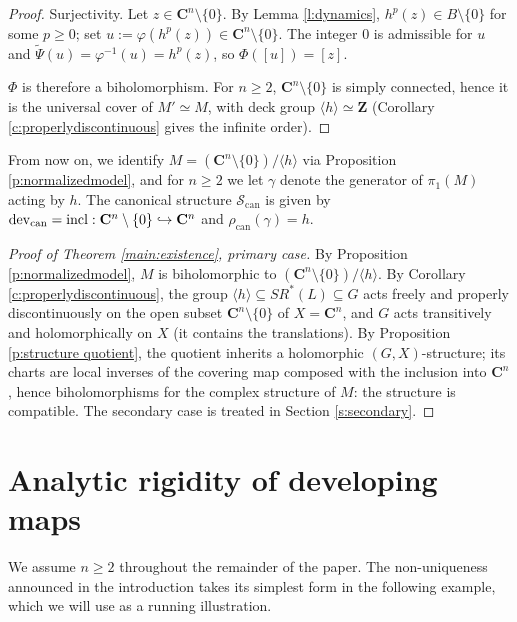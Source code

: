 \documentclass[english,11pt]{amsart}
\theoremstyle{definition}
\theoremstyle{remark}
\numberwithin{equation}{section}
\newcommand{\Z}{\mathbf{Z}}
\newcommand{\C}{\mathbf{C}}
\newcommand{\dev}{\mathop{\rm dev}\nolimits}
\newcommand{\Sc}{\mathcal{S}}
\begin{document}
\begin{proof}
Surjectivity. Let $z\in\C^n\setminus\{0\}$. By Lemma \ref{l:dynamics}, $h^{p}(z)\in B\setminus\{0\}$ for some $p\ge0$; set $u:=\varphi(h^{p}(z))\in \C^n\setminus\{0\}$. The integer $0$ is admissible for $u$ and $\widetilde\Psi(u)=\varphi^{-1}(u)=h^{p}(z)$, so $\Phi([u])=[z]$.

$\Phi$ is therefore a biholomorphism. For $n\ge2$, $\C^n\setminus\{0\}$ is simply connected, hence it is the universal cover of $M'\simeq M$, with deck group $\langle h\rangle\simeq\Z$ (Corollary \ref{c:properlydiscontinuous} gives the infinite order).
\end{proof}

From now on, we identify $M=(\C^n\setminus\{0\})/\langle h\rangle$ via Proposition \ref{p:normalizedmodel}, and for $n\geq 2$ we let $\gamma$ denote the generator of $\pi_1(M)$ acting by $h$. The canonical structure $\Sc_{\mathrm{can}}$ is given by $\dev_{\mathrm{can}}=\mathrm{incl}:\C^n\setminus\{0\}\hookrightarrow\C^n$ and $\rho_{\mathrm{can}}(\gamma)=h$.

\begin{proof}[Proof of Theorem \ref{main:existence}, primary case]
By Proposition \ref{p:normalizedmodel}, $M$ is biholomorphic to $(\C^n\setminus\{0\})/\langle h\rangle$. By Corollary \ref{c:properlydiscontinuous}, the group $\langle h\rangle\subseteq SR^*(L)\subseteq G$ acts freely and properly discontinuously on the open subset $\C^n\setminus\{0\}$ of $X=\C^n$, and $G$ acts transitively and holomorphically on $X$ (it contains the translations). By Proposition \ref{p:structure quotient}, the quotient inherits a holomorphic $(G,X)$-structure; its charts are local inverses of the covering map composed with the inclusion into $\C^n$, hence biholomorphisms for the complex structure of $M$: the structure is compatible. The secondary case is treated in Section \ref{s:secondary}.
\end{proof}

\section{Analytic rigidity of developing maps}\label{s:rigidity}

We assume $n\geq2$ throughout the remainder of the paper. The non-uniqueness announced in the introduction takes its simplest form in the following example, which we will use as a running illustration.
\end{document}
